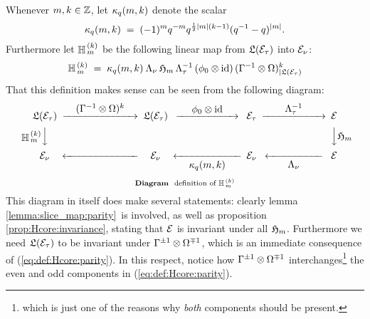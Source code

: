 \begin{defn} \label{def:YaH}
Whenever $m,k\in\mathbb{Z}$, let $\kappa_q(m,k)$ denote the scalar
$$  \kappa_q(m,k) \;=\; (-1)^m q^{-m} q^{\frac{1}{2}|m|(k-1)} (q^{-1}-q)^{|m|}. $$
Furthermore let $\mathbb{H}_{\,m}^{\,(k)}$ be the following linear map from
$\mathfrak{L}(\mathcal E_\tau)$ into $\mathcal E_\nu$:
$$ \mathbb{H}_{\,m}^{\,(k)}  \;=\;   \kappa_q(m,k) \: \Lambda_\nu \, \mathfrak{H}_{m} \, \Lambda_\tau^{-1}\,
         (\phi_0 \otimes \mbox{\rm id})\,(\Gamma^{-1} \otimes \Omega)_{|\mathfrak{L}(\mathcal E_\tau)}^k $$
That this definition makes sense can be seen from the following diagram:
$$\begin{CD}
 \calL(\Hcore_\tau)   @>{\textstyle \hspace{1em}(\Gamma^{-1} \tens \Omega)^k\hspace{1em}}>>
 \calL(\Hcore_\tau)   @>{\textstyle\;\hspace{1em} \evzero \tens \id\hspace{1em}\;}>>
 \Hcore_\tau          @>{\textstyle\hspace{2em}\Lambda_\tau^{-1}\hspace{2em}}>>
 \Hcore  \\
 @V{\textstyle\YaH{m}{k}}VV     @. @.
                      @VV{\textstyle \holH{m}}V \\
 \Hcore_\nu   @<<\hspace{7em}<  \Hcore_\nu
              @<<{\textstyle\;\hspace{1em} \kq(m,k) \hspace{1em}\; }<
 \Hcore_\nu   @<<{\textstyle  \hspace{2em} \Lambda_\nu\hspace{2em}}<
       \Hcore
\end{CD}$$
\nopagebreak
\begin{equation}\label{eq:diagram:YaH}
\mbox{\scriptsize {\bf Diagram}\hspace{3pt}\ definition of $\mathbb{H}_{\,m}^{\,(k)}$}
\end{equation}
This diagram in itself does make several statements:
clearly lemma \ref{lemma:slice_map:parity}\ is involved, as well as
proposition \ref{prop:Hcore:invariance}, stating that $\mathcal E$ is invariant
under all $\mathfrak{H}_{m}$. Furthermore we need $\mathfrak{L}(\mathcal E_\tau)$ to be invariant
under $\Gamma^{\pm 1} \otimes \Omega^{\mp 1}$, which is an immediate consequence of
(\ref{eq:def:Hcore:parity}). In this respect, notice how
$\Gamma^{\pm 1} \otimes \Omega^{\mp 1}$
interchanges\footnote{which is just one of the reasons why {\em both\/}
components should be present.} the even and
odd components in (\ref{eq:def:Hcore:parity}).
\end{defn}



